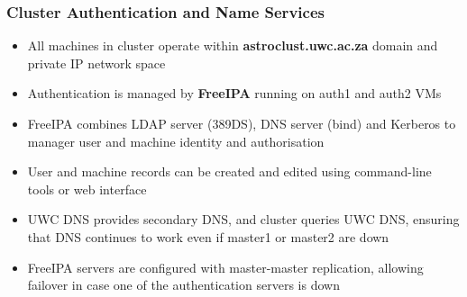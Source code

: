 \documentclass[handout]{beamer}
\begin{document}
\begin{frame}
\frametitle{Cluster Authentication and Name Services}
\begin{itemize}
\item All machines in cluster operate within \textbf{astroclust.uwc.ac.za} domain and private IP network space
\item Authentication is managed by \textbf{FreeIPA} running on auth1 and auth2 VMs
\item FreeIPA combines LDAP server (389DS), DNS server (bind) and Kerberos to manager user and machine identity and authorisation
\item User and machine records can be created and edited using command-line tools or web interface
\item UWC DNS provides secondary DNS, and cluster queries UWC DNS, ensuring that DNS continues to work even if master1 or master2 are down
\item FreeIPA servers are configured with master-master replication, allowing failover in case one of the authentication servers is down
\end{itemize}
\end{frame}
\end{document}
